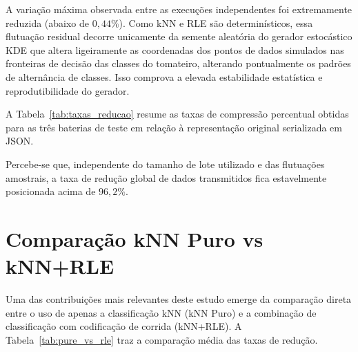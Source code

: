 \documentclass[
	12pt,
	openright,
	oneside,
	a4paper,
	english,
	brazil
	]{abntex2}
\begin{document}
A variação máxima observada entre as execuções independentes foi extremamente reduzida (abaixo de $0,44\%$). Como kNN e RLE são determinísticos, essa flutuação residual decorre unicamente da semente aleatória do gerador estocástico KDE que altera ligeiramente as coordenadas dos pontos de dados simulados nas fronteiras de decisão das classes do tomateiro, alterando pontualmente os padrões de alternância de classes. Isso comprova a elevada estabilidade estatística e reprodutibilidade do gerador.

A Tabela~\ref{tab:taxas_reducao} resume as taxas de compressão percentual obtidas para as três baterias de teste em relação à representação original serializada em JSON.

\begin{table}[H]
\centering
\caption{Taxas de redução acumuladas (kNN+RLE) em relação ao JSON original (\%)}
\label{tab:taxas_reducao}
\end{table}

Percebe-se que, independente do tamanho de lote utilizado e das flutuações amostrais, a taxa de redução global de dados transmitidos fica estavelmente posicionada acima de $96,2\%$.


\section{Comparação kNN Puro vs kNN+RLE}

Uma das contribuições mais relevantes deste estudo emerge da comparação direta entre o uso de apenas a classificação kNN (kNN Puro) e a combinação de classificação com codificação de corrida (kNN+RLE). A Tabela~\ref{tab:pure_vs_rle} traz a comparação média das taxas de redução.
\end{document}
